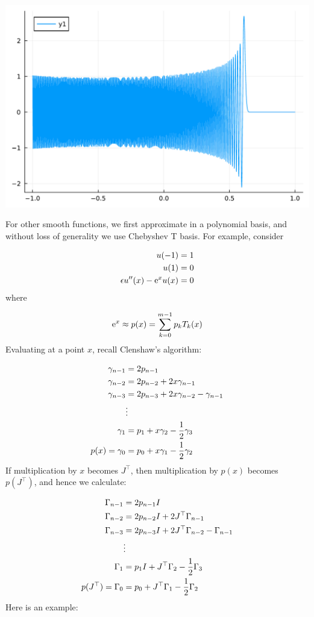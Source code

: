 \documentclass[12pt,a4paper]{article}
\begin{document}
\includegraphics[width=\linewidth]{jl_hpkPoK/OP_methods_test_46_1.pdf}

For other smooth functions, we first approximate in a polynomial basis,  and without loss of generality we use Chebyshev T basis. For example, consider


\begin{align*}
u(-1) &= 1\\
u(1) &= 0\\
\epsilon u''(x) - {\rm e}^x u(x) &= 0
\end{align*}
where

\[
{\rm e}^x  \approx p(x) = \sum_{k=0}^{m-1} p_k T_k(x)
\]
Evaluating at a point $x$, recall Clenshaw's algorithm:


\begin{align*}
\gamma_{n-1} &= 2p_{n-1} \\
\gamma_{n-2} &= 2p_{n-2} + 2x \gamma_{n-1} \\
\gamma_{n-3} &= 2 p_{n-3} + 2x \gamma_{n-2} - \gamma_{n-1} \\
& \vdots \\
\gamma_1 &= p_1 + x \gamma_2 - {1 \over 2} \gamma_3 \\
p(x) = \gamma_0 &= p_0 + x \gamma_1 - {1 \over 2} \gamma_2
\end{align*}
If multiplication by $x$ becomes $J^\top$, then multiplication by $p(x)$ becomes $p(J^\top)$, and hence we calculate:


\begin{align*}
\Gamma_{n-1} &= 2p_{n-1}I \\
\Gamma_{n-2} &= 2p_{n-2}I + 2J^\top \Gamma_{n-1} \\
\Gamma_{n-3} &= 2 p_{n-3}I + 2J^\top \Gamma_{n-2} - \Gamma_{n-1} \\
& \vdots \\
\Gamma_1 &= p_1I + J^\top \Gamma_2 - {1 \over 2} \Gamma_3 \\
p(J^\top) = \Gamma_0 &= p_0 + J^\top \Gamma_1 - {1 \over 2} \Gamma_2
\end{align*}
Here is an example:
\end{document}
